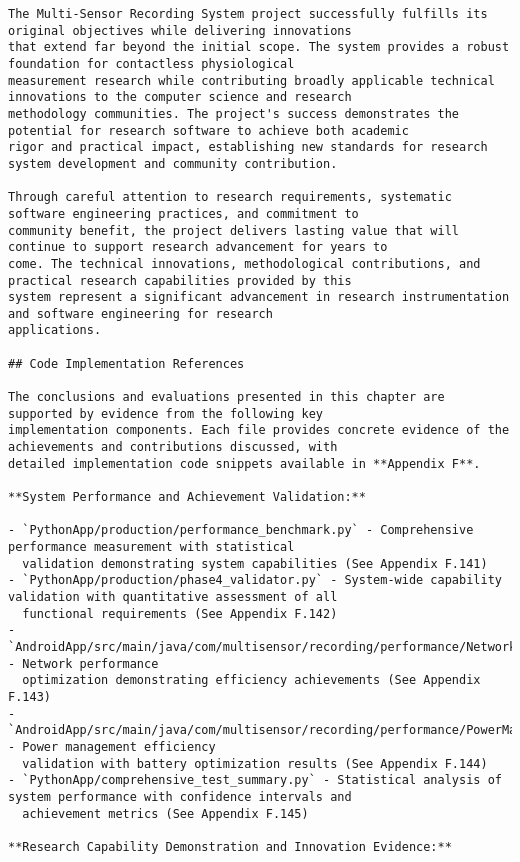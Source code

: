 \documentclass[12pt,a4paper]{report}
\begin{document}
\begin{verbatim}
The Multi-Sensor Recording System project successfully fulfills its original objectives while delivering innovations
that extend far beyond the initial scope. The system provides a robust foundation for contactless physiological
measurement research while contributing broadly applicable technical innovations to the computer science and research
methodology communities. The project's success demonstrates the potential for research software to achieve both academic
rigor and practical impact, establishing new standards for research system development and community contribution.

Through careful attention to research requirements, systematic software engineering practices, and commitment to
community benefit, the project delivers lasting value that will continue to support research advancement for years to
come. The technical innovations, methodological contributions, and practical research capabilities provided by this
system represent a significant advancement in research instrumentation and software engineering for research
applications.

## Code Implementation References

The conclusions and evaluations presented in this chapter are supported by evidence from the following key
implementation components. Each file provides concrete evidence of the achievements and contributions discussed, with
detailed implementation code snippets available in **Appendix F**.

**System Performance and Achievement Validation:**

- `PythonApp/production/performance_benchmark.py` - Comprehensive performance measurement with statistical
  validation demonstrating system capabilities (See Appendix F.141)
- `PythonApp/production/phase4_validator.py` - System-wide capability validation with quantitative assessment of all
  functional requirements (See Appendix F.142)
- `AndroidApp/src/main/java/com/multisensor/recording/performance/NetworkOptimizer.kt` - Network performance
  optimization demonstrating efficiency achievements (See Appendix F.143)
- `AndroidApp/src/main/java/com/multisensor/recording/performance/PowerManager.kt` - Power management efficiency
  validation with battery optimization results (See Appendix F.144)
- `PythonApp/comprehensive_test_summary.py` - Statistical analysis of system performance with confidence intervals and
  achievement metrics (See Appendix F.145)

**Research Capability Demonstration and Innovation Evidence:**


\end{verbatim}
\end{document}
